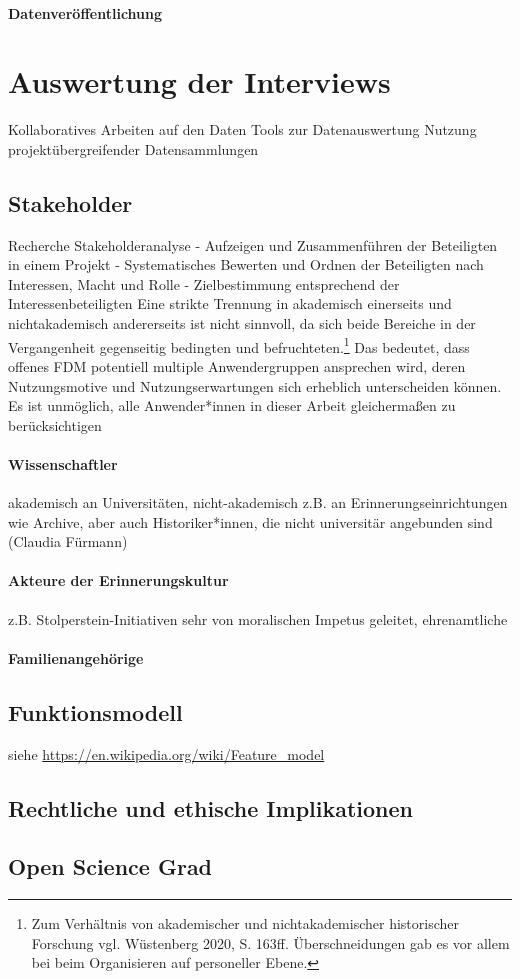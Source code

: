 \paragraph{Datenveröffentlichung}




\section{Auswertung der Interviews}
Kollaboratives Arbeiten auf den Daten
Tools zur Datenauswertung
Nutzung projektübergreifender Datensammlungen 

\subsection{Stakeholder}
Recherche
Stakeholderanalyse
- Aufzeigen und Zusammenführen der Beteiligten in einem Projekt
- Systematisches Bewerten und Ordnen der Beteiligten nach Interessen, Macht und Rolle
- Zielbestimmung entsprechend der Interessenbeteiligten
Eine strikte Trennung in akademisch einerseits und nichtakademisch andererseits ist nicht sinnvoll, da sich beide Bereiche in der Vergangenheit gegenseitig bedingten und befruchteten.\footnote{Zum Verhältnis von akademischer und nichtakademischer historischer Forschung vgl. Wüstenberg 2020, S. 163ff. Überschneidungen gab es vor allem bei beim Organisieren auf personeller Ebene.} Das bedeutet, dass offenes FDM potentiell multiple Anwendergruppen ansprechen wird, deren Nutzungsmotive und Nutzungserwartungen sich erheblich unterscheiden können. Es ist unmöglich, alle Anwender*innen in dieser Arbeit gleichermaßen zu berücksichtigen
\paragraph{Wissenschaftler}

akademisch an Universitäten, nicht-akademisch z.B. an Erinnerungseinrichtungen wie Archive, aber auch Historiker*innen, die nicht universitär angebunden sind (Claudia Fürmann)


\paragraph{Akteure der Erinnerungskultur}

z.B. Stolperstein-Initiativen sehr von moralischen Impetus geleitet, ehrenamtliche

\paragraph{Familienangehörige}

\subsection{Funktionsmodell}

siehe \url{https://en.wikipedia.org/wiki/Feature_model}


\subsection{Rechtliche und ethische Implikationen}


\subsection{Open Science Grad}
